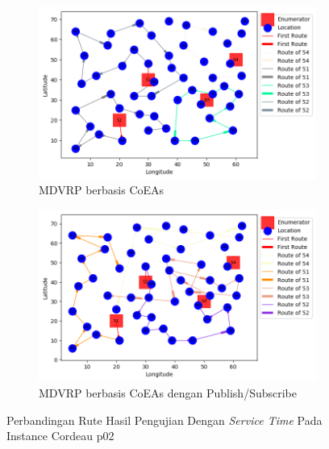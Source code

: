 \begin{figure}[H]
	\centering
	\begin{subfigure}[t]{\textwidth}
		\centering
		\includegraphics[width=\textwidth]{Resources/Images/cordeau_p02_tw/cordeau_p02_tw_coes}
		\caption{MDVRP berbasis CoEAs}
		\label{fig:cordeau_p02_tw_coes}
	\end{subfigure}
	\begin{subfigure}[t]{\textwidth}
		\centering
		\includegraphics[width=\textwidth]{Resources/Images/cordeau_p02_tw/cordeau_p02_tw_pubsub_coes}
		\caption{MDVRP berbasis CoEAs dengan Publish/Subscribe}
		\label{fig:cordeau_p02_tw_pubsub_coes}
	\end{subfigure}
	\caption{Perbandingan Rute Hasil Pengujian Dengan \textit{Service Time} Pada Instance Cordeau p02}
	\label{fig:cordeau_p02_tw}
\end{figure}


